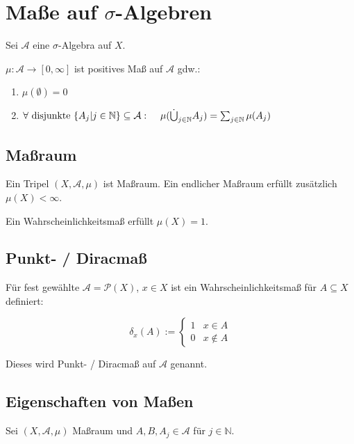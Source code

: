 \section*{Maße auf $\sigma$-Algebren}

Sei $\mathcal{A}$ eine $\sigma$-Algebra auf $X$.

$\mu : \mathcal{A} \rightarrow [0, \infty]$ ist positives Maß auf $\mathcal{A}$ gdw.:

\begin{enumerate}[label=(\alph*)]
	\item $\mu(\emptyset) = 0$
	\item $\forall \text{ disjunkte } \{A_j | j \in \mathbb{N}\} \subseteq \mathcal{A} :\\ \hspace*{4mm} \mu(\dot\bigcup_{j\in \mathbb{N}} A_j) = \sum_{j\in \mathbb{N}} \mu(A_j)$
\end{enumerate}

\subsection*{Maßraum}

Ein Tripel $(X, \mathcal{A}, \mu)$ ist Maßraum. Ein endlicher Maßraum erfüllt zusätzlich $\mu(X) < \infty$.

Ein Wahrscheinlichkeitsmaß erfüllt $\mu(X) = 1$.

\subsection*{Punkt- / Diracmaß}

Für fest gewählte $\mathcal{A} = \mathcal{P}(X)$, $x \in X$ ist ein Wahrscheinlichkeitsmaß für $A \subseteq X$ definiert:

$$\delta_x(A) := \begin{cases}
	1 & x \in A \\
	0 & x \notin A
\end{cases}$$

Dieses wird Punkt- / Diracmaß auf $\mathcal{A}$ genannt.

\subsection*{Eigenschaften von Maßen}

Sei $(X, \mathcal{A}, \mu)$ Maßraum und $A, B, A_j \in \mathcal{A}$ für $j \in \mathbb{N}$.

